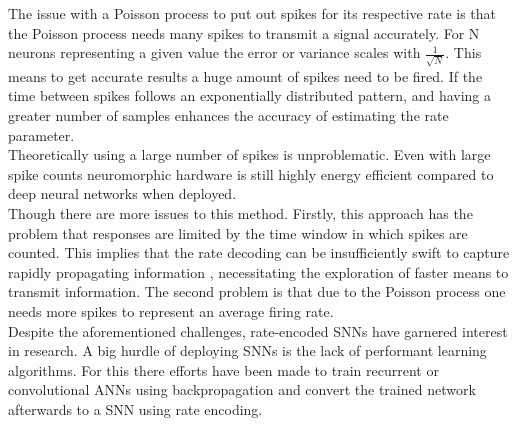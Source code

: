 The issue with a Poisson process to put out spikes for its respective rate is that the Poisson process needs many spikes to transmit a signal accurately. For N neurons representing a given value the error or variance scales with $\frac{1}{\sqrt{N}}$\cite{boerlin_predictive_2013}. This means to get accurate results a huge amount of spikes need to be fired. If the time between spikes follows an exponentially distributed pattern, and having a greater number of samples enhances the accuracy of estimating the rate parameter.\\
Theoretically using a large number of spikes is unproblematic. Even with large spike counts neuromorphic hardware is still highly energy efficient compared to deep neural networks when deployed\cite{indiveri_importance_2019}.\\


Though there are more issues to this method. Firstly, this approach has the problem that responses are limited by the time window in which spikes are counted\cite{andrew_spiking_2003}. This implies that the rate decoding can be insufficiently swift to capture rapidly propagating information \cite{guo_neural_2021}, necessitating the exploration of faster means to transmit information.
The second problem is that due to the Poisson process one needs more spikes to represent an average firing rate.\\
Despite the aforementioned challenges, rate-encoded \acp{SNN} have garnered interest in research. A big hurdle of deploying \acp{SNN} is the lack of performant learning algorithms. For this there efforts have been made to train recurrent or convolutional \acp{ANN} using backpropagation and convert the trained network afterwards to a \ac{SNN}\cite{pfeiffer_deep_2018} using rate encoding\cite{diehl_conversion_2016}\cite{diehl_fast-classifying_2015}.
